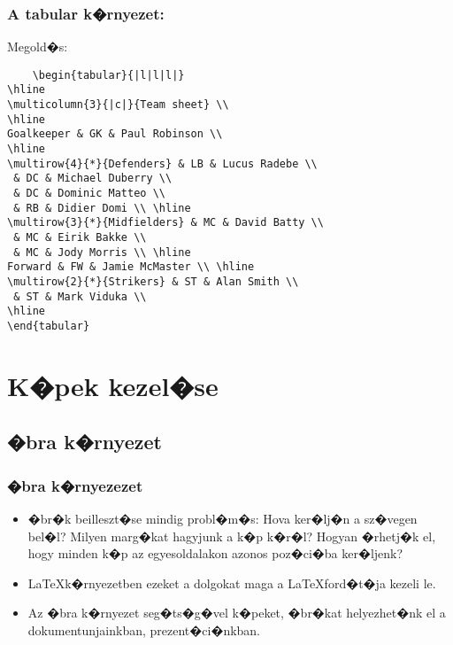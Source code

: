 \documentclass[xcolor=pdftex,dvipsnames,table,compress,bigger]{beamer}
\begin{document}
\begin{frame}[fragile]
    \frametitle{A tabular k�rnyezet:}
    \begin{block}{Megold�s:}
    {\scriptsize
    \begin{verbatim}
    \begin{tabular}{|l|l|l|}
\hline
\multicolumn{3}{|c|}{Team sheet} \\
\hline
Goalkeeper & GK & Paul Robinson \\ 
\hline
\multirow{4}{*}{Defenders} & LB & Lucus Radebe \\
 & DC & Michael Duberry \\
 & DC & Dominic Matteo \\
 & RB & Didier Domi \\ \hline
\multirow{3}{*}{Midfielders} & MC & David Batty \\
 & MC & Eirik Bakke \\
 & MC & Jody Morris \\ \hline
Forward & FW & Jamie McMaster \\ \hline
\multirow{2}{*}{Strikers} & ST & Alan Smith \\
 & ST & Mark Viduka \\
\hline
\end{tabular}
\end{verbatim}}
    \end{block}
\end{frame}

\section{K�pek kezel�se}
\subsection{�bra k�rnyezet}
\begin{frame}
	\frametitle{�bra k�rnyezezet}
		\begin{itemize}
			\item �br�k beilleszt�se mindig probl�m�s: Hova ker�lj�n a sz�vegen bel�l? Milyen marg�kat hagyjunk a k�p k�r�l? Hogyan �rhetj�k el, hogy minden k�p az egyesoldalakon azonos poz�ci�ba ker�ljenk?
			\item \LaTeX k�rnyezetben ezeket a dolgokat maga a \LaTeX ford�t�ja kezeli le.
			\item Az �bra k�rnyezet seg�ts�g�vel k�peket, �br�kat helyezhet�nk el a dokumentunjainkban, prezent�ci�nkban.
		\end{itemize}

\end{frame}
\end{document}
